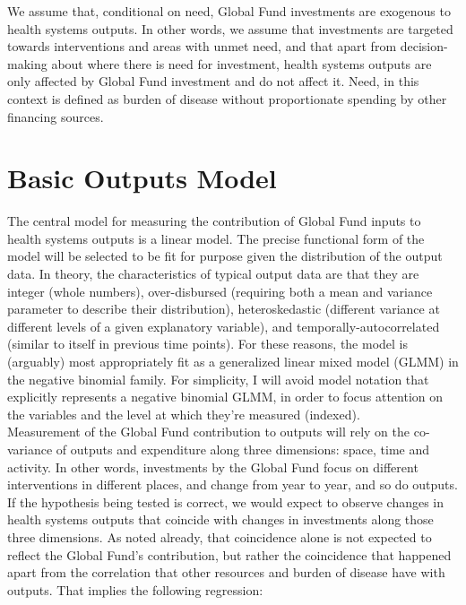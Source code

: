 \documentclass[twocolumn]{bmcart}%
\begin{document}
We assume that, conditional on need, Global Fund investments are exogenous to health systems outputs. In other words, we assume that investments are targeted towards interventions and areas with unmet need, and that apart from decision-making about where there is need for investment, health systems outputs are only affected by Global Fund investment and do not affect it. Need, in this context is defined as burden of disease without proportionate spending by other financing sources.


\section{Basic Outputs Model}

The central model for measuring the contribution of Global Fund inputs to health systems outputs is a linear model. The precise functional form of the model will be selected to be fit for purpose given the distribution of the output data. In theory, the characteristics of typical output data are that they are integer (whole numbers), over-disbursed (requiring both a mean and variance parameter to describe their distribution), heteroskedastic (different variance at different levels of a given explanatory variable), and temporally-autocorrelated (similar to itself in previous time points). For these reasons, the model is (arguably) most appropriately fit as a generalized linear mixed model (GLMM) in the negative binomial family. For simplicity, I will avoid model notation that explicitly represents a negative binomial GLMM, in order to focus attention on the variables and the level at which they're measured (indexed). \\

Measurement of the Global Fund contribution to outputs will rely on the co-variance of outputs and expenditure along three dimensions: space, time and activity. In other words, investments by the Global Fund focus on different interventions in different places, and change from year to year, and so do outputs. If the hypothesis being tested is correct, we would expect to observe changes in health systems outputs that coincide with changes in investments along those three dimensions. As noted already, that coincidence alone is not expected to reflect the Global Fund's contribution, but rather the coincidence that happened apart from the correlation that other resources and burden of disease have with outputs. That implies the following regression:
\end{document}
